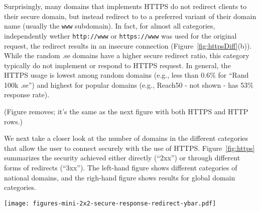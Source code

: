 \documentclass{sig-alternate-10pt}
\begin{document}
Surprisingly, many domains that implements HTTPS do not redirect clients to their secure domain,
but instead redirect to to a preferred variant of their domain name (usually the \texttt{www} subdomain).
In fact, for almost all categories, 
independently wether \texttt{http://www} or \texttt{https://www} was used for the original request,
the redirect results in an insecure connection (Figure~\ref{fig:httpsDiff}(b)).
While the random .se domains have a higher secure redirect ratio,
this category typically do not implement or respond to HTTPS request. 
In general,
the HTTPS usage is lowest among random domains (e.g., less than 0.6\% for ``Rand 100k .se'')
and highest for popular domains (e.g., Reach50 - not shown - has 53\% response rate).



\begin{figure*}[t]
(Figure removes; it's the same as the next figure with both HTTPS and HTTP rows.)
\caption{Secure connections for succesful connections when trying to use HTTPS.
(Note that the majority of websites (as per Figure~\ref{fig:httpsDiff}) do not respond.)}
\label{fig:https}
\vspace{-0pt}
\end{figure*}

We next take a closer look at the number of domains in the different categories 
that allow the user to connect securely with the use of HTTPS.  Figure~\ref{fig:https} 
summarizes the security achieved either directly (``2xx'')
or through different forms of redirects (``3xx'').  The left-hand figure
shows different categories of national domains, and the righ-hand figure
shows results for global domain categories.

\begin{figure*}[t]
\texttt{[image: figures-mini-2x2-secure-response-redirect-ybar.pdf]}
\caption{Secure connections for succesful HTTPS attempts (top row)
and HTTP attempts (bottom row).
(Note that the majority of websites does not respnd to HTTPS (as per Figure~\ref{fig:httpsDiff}).)}
\label{fig:https2}
\vspace{-0pt}
\end{figure*}
\end{document}
